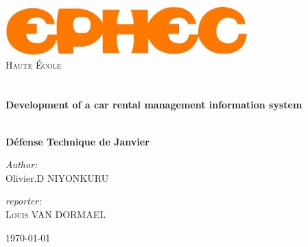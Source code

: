 \begin{titlepage}
\begin{center}

\includegraphics[width=0.7\textwidth]{Logo_Ephec.png}~\\[1cm]

\textsc{\LARGE Haute \'{E}cole}\\[1.5cm]

\textsc{\Large }\\[0.5cm]

\HRule \\[0.4cm]

{\huge \bfseries Development of a car rental management information system \\[0.4cm] }

\HRule \\[0.5cm]

\textbf{Défense Technique de Janvier}

\vspace{1.cm}

\begin{minipage}{0.4\textwidth}
\begin{flushleft} \large
\emph{Author:}\\
Olivier.D NIYONKURU\\
\end{flushleft}
\end{minipage}
\begin{minipage}{0.4\textwidth}
\begin{flushright} \large
\emph{reporter:} \\
\textsc{Louis VAN DORMAEL}
\end{flushright}
\end{minipage}

\vfill

{\large \today}

\end{center}
\end{titlepage}